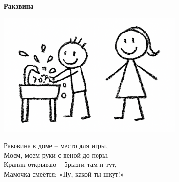 \vspace*{\fill}
\begin{center}
  {\huge\textbf{Раковина}}

  \vspace{1.5em}  \includegraphics[width=0.7\textwidth]{pictures/toothbrush.jpg}
  \vspace{4em}
  \parbox{0.6\textwidth}{
    \LARGE
    \begin{spacing}{1.2}
      Раковина в доме – место для игры,\\
      Моем, моем руки с пеной до поры.\\
      Краник открываю – брызги там и тут,\\
      Мамочка смеётся: «Ну, какой ты шкут!» %
    \end{spacing}
      
  }
\end{center}
\vspace*{\fill}